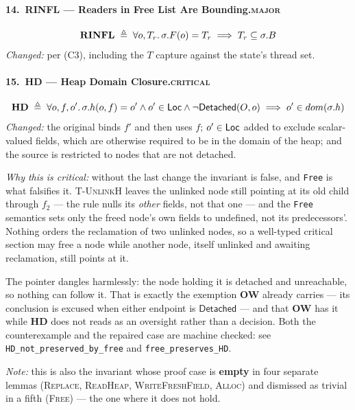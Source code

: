 \paragraph{14.\ RINFL --- Readers in Free List Are Bounding.\hfill\textsc{major}}
\[\textbf{RINFL} \;\triangleq\; \forall o,T_{r} \ldotp \sigma.F(o) = T_{r} \implies T_{r} \subseteq \sigma.B\]
\emph{Changed:} per (C3), including the $T$ capture against the state's thread
set.

\paragraph{15.\ HD --- Heap Domain Closure.\hfill\textsc{critical}}
\[\textbf{HD} \;\triangleq\; \forall o,f,o' \ldotp \sigma.h(o,f) = o' \land o' \in \textsf{Loc}
   \land \lnot\textsf{Detached}(O,o) \implies o' \in dom(\sigma.h)\]
\emph{Changed:} the original binds $f'$ and then uses $f$; $o' \in \textsf{Loc}$ added to
exclude scalar-valued fields, which are otherwise required to be in the domain
of the heap; and the source is restricted to nodes that are not detached.

\emph{Why this is critical:} without the last change the invariant is false, and
\texttt{Free} is what falsifies it.  \textsc{T-UnlinkH} leaves the unlinked node
still pointing at its old child through $f_2$ --- the rule nulls its \emph{other}
fields, not that one --- and the \texttt{Free} semantics sets only the freed
node's own fields to undefined, not its predecessors'.  Nothing orders the
reclamation of two unlinked nodes, so a well-typed critical section may free a
node while another node, itself unlinked and awaiting reclamation, still points
at it.

The pointer dangles harmlessly: the node holding it is detached and unreachable,
so nothing can follow it.  That is exactly the exemption \textbf{OW} already
carries --- its conclusion is excused when either endpoint is
$\textsf{Detached}$ --- and that \textbf{OW} has it while \textbf{HD} does not
reads as an oversight rather than a decision.  Both the counterexample and the
repaired case are machine checked: see \texttt{HD\_not\_preserved\_by\_free} and
\texttt{free\_preserves\_HD}.

\emph{Note:} this is also the invariant whose proof case is \textbf{empty} in
four separate lemmas (\textsc{Replace}, \textsc{ReadHeap},
\textsc{WriteFreshField}, \textsc{Alloc}) and dismissed as trivial in a fifth
(\textsc{Free}) --- the one where it does not hold.

